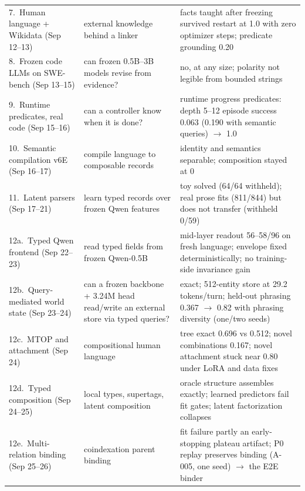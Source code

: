 \documentclass[10pt]{article}
\begin{document}
\begin{center}
\begin{tabularx}{\linewidth}{@{}>{\raggedright}p{3.3cm}>{\raggedright}p{4.2cm}>{\raggedright\arraybackslash}X@{}}
7.~Human language + Wikidata (Sep 12--13) & external knowledge behind a linker & 300 facts taught after freezing survived restart at 1.0 with zero optimizer steps; predicate grounding 0.20 \\
8.~Frozen code LLMs on SWE-bench (Sep 13--15) & can frozen 0.5B--3B models revise from evidence? & no, at any size; polarity not legible from bounded strings \\
9.~Runtime predicates, real code (Sep 15--16) & can a controller know when it is done? & runtime progress predicates: depth 5--12 episode success 0.063 (0.190 with semantic queries) $\rightarrow$ 1.0 \\
10.~Semantic compilation v6E (Sep 16--17) & compile language to composable records & identity and semantics separable; composition stayed at 0 \\
11.~Latent parsers (Sep 17--21) & learn typed records over frozen Qwen features & toy solved (64/64 withheld); real prose fits (811/844) but does not transfer (withheld 0/59) \\
12a.~Typed Qwen frontend (Sep 22--23) & read typed fields from frozen Qwen-0.5B & mid-layer readout 56--58/96 on fresh language; envelope fixed deterministically; no training-side invariance gain \\
12b.~Query-mediated world state (Sep 23--24) & can a frozen backbone + 3.24M head read/write an external store via typed queries? & 0.985 exact; 512-entity store at 29.2 tokens/turn; held-out phrasing 0.367 $\rightarrow$ 0.82 with phrasing diversity (one/two seeds) \\
12c.~MTOP and attachment (Sep 24) & compositional human language & tree exact 0.696 vs 0.512; novel combinations 0.167; novel attachment stuck near 0.80 under LoRA and data fixes \\
12d.~Typed composition (Sep 24--25) & local types, supertags, latent composition & oracle structure assembles exactly; learned predictors fail fit gates; latent factorization collapses \\
12e.~Multi-relation binding (Sep 25--26) & coindexation parent binding & fit failure partly an early-stopping plateau artifact; P0 replay preserves binding (A-005, one seed) $\rightarrow$ the E2E binder \\
\bottomrule
\end{tabularx}
\end{center}
\end{document}
